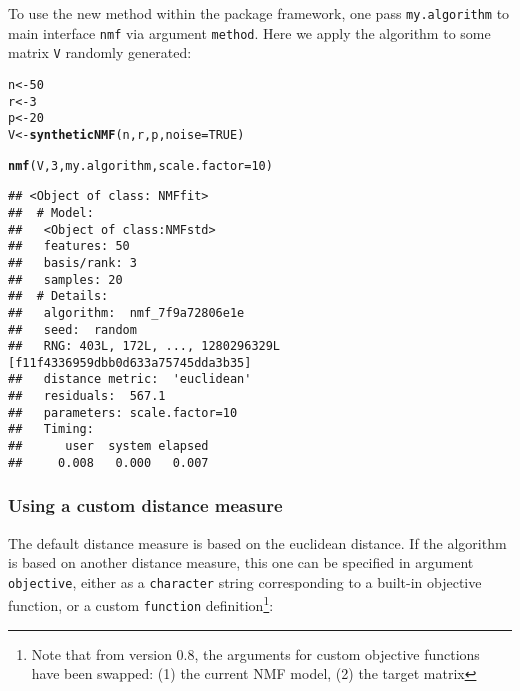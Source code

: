 \documentclass[a4paper]{article}\usepackage{graphicx, color}
\makeatletter
\newcommand{\hlfunctioncall}[1]{\textcolor[rgb]{0.501960784313725,0,0.329411764705882}{\textbf{#1}}}%
\newenvironment{kframe}{%
 \def\at@end@of@kframe{}%
 \ifinner\ifhmode%
  \def\at@end@of@kframe{\end{minipage}}%
  \begin{minipage}{\columnwidth}%
 \fi\fi%
 \def\FrameCommand##1{\hskip\@totalleftmargin \hskip-\fboxsep
 \colorbox{shadecolor}{##1}\hskip-\fboxsep
     \hskip-\linewidth \hskip-\@totalleftmargin \hskip\columnwidth}%
 \MakeFramed {\advance\hsize-\width
   \@totalleftmargin\z@ \linewidth\hsize
   \@setminipage}}%
 {\par\unskip\endMakeFramed%
 \at@end@of@kframe}
\newenvironment{knitrout}{}{} %
\let\code=\texttt
\makeatother
\begin{document}
To use the new method within the package framework, one pass \code{my.algorithm} to main interface \code{nmf} via argument \code{method}. 
Here we apply the algorithm to some matrix \code{V} randomly generated: 

\begin{knitrout}
\color{fgcolor}\begin{kframe}
\begin{alltt}
n <- 50
r <- 3
p <- 20
V <- \hlfunctioncall{syntheticNMF}(n, r, p, noise = TRUE)
\end{alltt}
\end{kframe}
\end{knitrout}


\begin{knitrout}
\color{fgcolor}\begin{kframe}
\begin{alltt}
\hlfunctioncall{nmf}(V, 3, my.algorithm, scale.factor = 10)
\end{alltt}
\begin{verbatim}
## <Object of class: NMFfit>
##  # Model:
##   <Object of class:NMFstd>
##   features: 50 
##   basis/rank: 3 
##   samples: 20 
##  # Details:
##   algorithm:  nmf_7f9a72806e1e 
##   seed:  random 
##   RNG: 403L, 172L, ..., 1280296329L [f11f4336959dbb0d633a75745dda3b35]
##   distance metric:  'euclidean' 
##   residuals:  567.1 
##   parameters: scale.factor=10 
##   Timing:
##      user  system elapsed 
##     0.008   0.000   0.007
\end{verbatim}
\end{kframe}
\end{knitrout}


\subsubsection{Using a custom distance measure}
The default distance measure is based on the euclidean distance. 
If the algorithm is based on another distance measure, this one can be specified in argument \code{objective}, either as a \code{character} string corresponding to a built-in objective function, or a custom \code{function} definition\footnote{Note that from version 0.8, the arguments for custom objective functions have been swapped: (1) the current NMF model, (2) the target matrix}:
\end{document}
